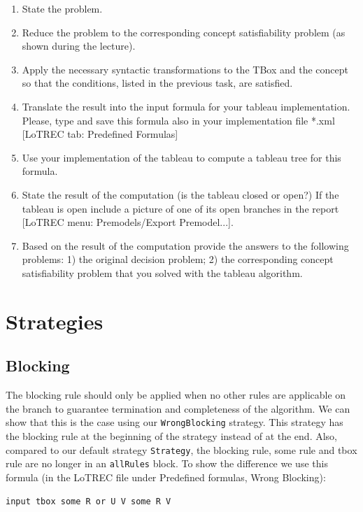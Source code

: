 \documentclass[11pt]{article} %
\begin{document}
\begin{enumerate}
\item State the problem.
\item Reduce the problem to the corresponding concept satisfiability problem (as shown during the lecture).
\item Apply the necessary syntactic transformations to the TBox and the concept so that the conditions, listed in the previous task, are satisfied.
\item Translate the result into the input formula for your tableau implementation. Please, type and save this formula also in your implementation file *.xml [LoTREC tab: Predefined Formulas]
\item Use your implementation of the tableau to compute a tableau tree for this formula.
\item State the result of the computation (is the tableau closed or open?) If the tableau is open include a picture of one of its open branches in the report [LoTREC menu: Premodels/Export Premodel...].
\item Based on the result of the computation provide the answers to the following problems: 1) the original decision problem; 2) the corresponding concept satisfiability problem that you solved with the tableau algorithm.
\end{enumerate}

\section{Strategies}
\label{sec:strategies}

\subsection{Blocking}

The blocking rule should only be applied when no other rules are applicable on the branch to guarantee termination and completeness of the algorithm. We can show that this is the case using our \texttt{WrongBlocking} strategy. This strategy has the blocking rule at the beginning of the strategy instead of at the end. Also, compared to our default strategy \texttt{Strategy}, the blocking rule, some rule and tbox rule are no longer in an \texttt{allRules} block. To show the difference we use this formula (in the LoTREC file under Predefined formulas, Wrong Blocking):

\begin{center}
\texttt{input tbox some R or U V some R V}
\end{center}
\end{document}
